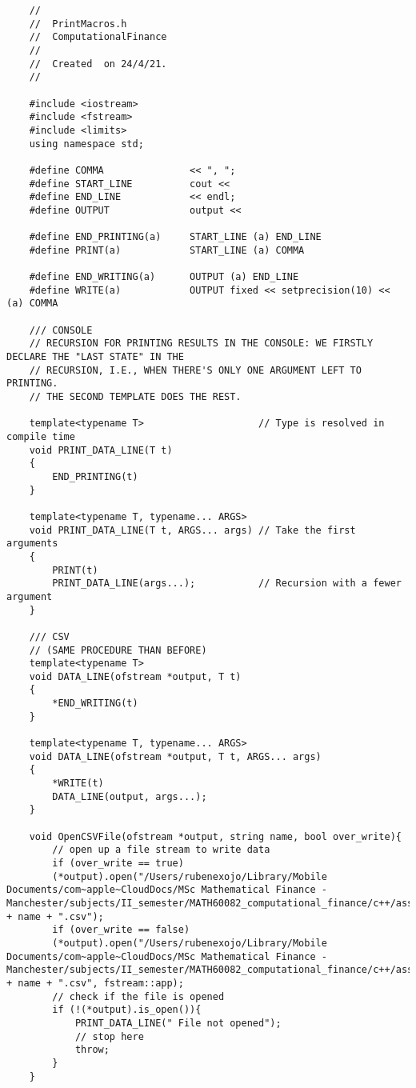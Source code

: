 \begin{lstlisting}
	//
	//  PrintMacros.h
	//  ComputationalFinance
	//
	//  Created  on 24/4/21.
	//
	
	#include <iostream>
	#include <fstream>
	#include <limits>
	using namespace std;
	
	#define COMMA               << ", ";
	#define START_LINE          cout <<
	#define END_LINE            << endl;
	#define OUTPUT              output <<
	
	#define END_PRINTING(a)     START_LINE (a) END_LINE
	#define PRINT(a)            START_LINE (a) COMMA
	
	#define END_WRITING(a)      OUTPUT (a) END_LINE
	#define WRITE(a)            OUTPUT fixed << setprecision(10) << (a) COMMA
	
	/// CONSOLE
	// RECURSION FOR PRINTING RESULTS IN THE CONSOLE: WE FIRSTLY DECLARE THE "LAST STATE" IN THE
	// RECURSION, I.E., WHEN THERE'S ONLY ONE ARGUMENT LEFT TO PRINTING.
	// THE SECOND TEMPLATE DOES THE REST.
	
	template<typename T>                    // Type is resolved in compile time
	void PRINT_DATA_LINE(T t)
	{
		END_PRINTING(t)
	}
	
	template<typename T, typename... ARGS>
	void PRINT_DATA_LINE(T t, ARGS... args) // Take the first arguments
	{
		PRINT(t)
		PRINT_DATA_LINE(args...);           // Recursion with a fewer argument
	}
	
	/// CSV
	// (SAME PROCEDURE THAN BEFORE)
	template<typename T>
	void DATA_LINE(ofstream *output, T t)
	{
		*END_WRITING(t)
	}
	
	template<typename T, typename... ARGS>
	void DATA_LINE(ofstream *output, T t, ARGS... args)
	{
		*WRITE(t)
		DATA_LINE(output, args...);
	}
	
	void OpenCSVFile(ofstream *output, string name, bool over_write){
		// open up a file stream to write data
		if (over_write == true)
		(*output).open("/Users/rubenexojo/Library/Mobile Documents/com~apple~CloudDocs/MSc Mathematical Finance - Manchester/subjects/II_semester/MATH60082_computational_finance/c++/assignment2/data/" + name + ".csv");
		if (over_write == false)
		(*output).open("/Users/rubenexojo/Library/Mobile Documents/com~apple~CloudDocs/MSc Mathematical Finance - Manchester/subjects/II_semester/MATH60082_computational_finance/c++/assignment2/data/" + name + ".csv", fstream::app);
		// check if the file is opened
		if (!(*output).is_open()){
			PRINT_DATA_LINE(" File not opened");
			// stop here
			throw;
		}
	}
\end{lstlisting}

